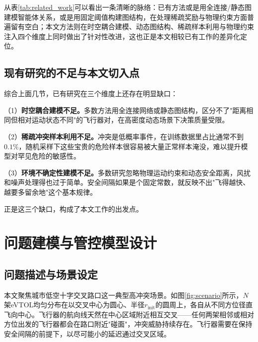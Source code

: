 \documentclass[12pt,a4paper,UTF8]{ctexart}
\begin{document}
从表\ref{tab:related_work}可以看出一条清晰的脉络：已有方法或是用全连接/静态图建模智能体关系，或是用固定阈值构建图结构，在处理稀疏奖励与物理约束方面普遍留有空白；本文方法则在时空耦合建模、动态图结构、稀疏样本利用与物理约束注入四个维度上同时做出了针对性改进，这也正是本文相较已有工作的差异化定位。

\subsection{现有研究的不足与本文切入点}

综合上面几节，已有研究在三个维度上还存在明显缺口：

（1）\textbf{时空耦合建模不足。}多数方法用全连接网络或静态图结构\cite{ref8,ref10,ref11}，区分不了"距离相同但相对运动状态不同"的飞行器对，在高密度动态场景下决策质量受限。

（2）\textbf{稀疏冲突样本利用不足。}冲突是低概率事件，在训练数据里占比通常不到$0.1\%$\cite{ref12,ref13}，随机采样下这些宝贵的危险样本很容易被大量正常样本淹没，难以提升模型对罕见危险的敏感性。

（3）\textbf{环境不确定性建模不足。}多数研究忽略物理运动约束和动态安全距离\cite{ref11}，风扰和噪声处理得也过于简单。安全间隔如果是个固定常数，就反映不出"飞得越快、越要多留余地"这个基本规律。

正是这三个缺口，构成了本文工作的出发点。

\section{问题建模与管控模型设计}

\subsection{问题描述与场景设定}

本文聚焦城市低空十字交叉路口这一典型高冲突场景。如图\ref{fig:scenario}所示，$N$架eVTOL均匀分布在以交叉中心为圆心、半径$r_{\text{init}}$的圆周上，各自从不同方位径直飞向中心。飞行器的航向线天然在中心区域附近相互交叉——任何两架相邻或相对方位出发的飞行器都会在路口附近"碰面"，冲突威胁持续存在。飞行器需要在保持安全间隔的前提下，以尽可能小的延迟通过交叉区域。
\end{document}
